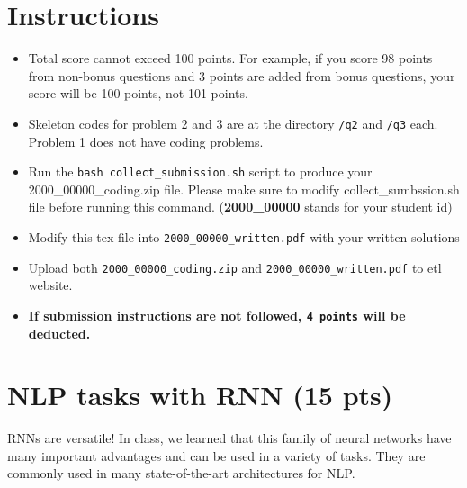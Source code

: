 \documentclass{assignment format}
\begin{document}
\begin{center}

\end{center}

\section{Instructions}
\begin{itemize}
\item Total score cannot exceed 100 points. For example, if you score 98 points from non-bonus questions and 3 points are added from bonus questions, your score will be 100 points, not 101 points.
\item Skeleton codes for problem 2 and 3 are at the directory \texttt{/q2} and \texttt{/q3} each. Problem 1 does not have coding problems. 
\item Run the \texttt{bash collect\_submission.sh} script to produce your 2000\_00000\_coding.zip file. Please make sure to modify collect\_sumbssion.sh file before running this command. (\textbf{2000\_00000} stands for your student id)
\item Modify this tex file into \texttt{2000\_00000\_written.pdf} with your written solutions
\item Upload both \texttt{2000\_00000\_coding.zip} and \texttt{2000\_00000\_written.pdf} to etl website.
\item \textbf{If submission instructions are not followed, \texttt{4 points} will be deducted.}
\end{itemize}

\section{NLP tasks with RNN (15 pts)}
RNNs are versatile! In class, we learned that this family of neural networks have many important advantages and can be used in a variety of tasks. They are commonly used in many state-of-the-art architectures for NLP.
\end{document}

